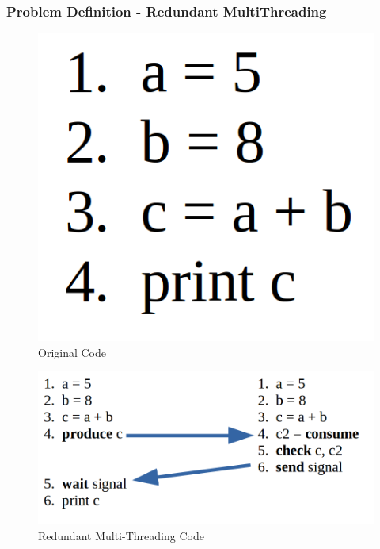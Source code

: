 \documentclass[xcolor=pdftex,dvipsnames,table]{beamer}
\begin{document}
\begin{frame}
	\frametitle{Problem Definition - Redundant MultiThreading}		
	\begin{figure}[H]
    	\begin{center}
        	\captionsetup{labelformat=empty,labelsep=none}
        	\includegraphics[scale=0.15]{OriginalCode.png}
            \caption{Original Code}
    	\end{center}
   	\end{figure}  
    
    \begin{figure}[H]
    	\begin{center}
            \captionsetup{labelformat=empty,labelsep=none}
        	\includegraphics[scale=0.25]{RMT-Code.png}
            \caption{Redundant Multi-Threading Code}
    	\end{center}
   	\end{figure}  
\end{frame}
\end{document}
